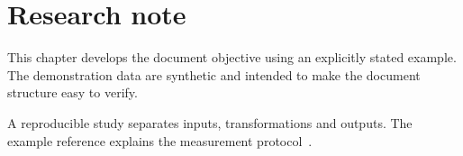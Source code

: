 \section{Research note}


\label{sec:chapter1}
This chapter develops the document objective using an explicitly stated example. The demonstration data are synthetic and intended to make the document structure easy to verify.

A reproducible study separates inputs, transformations and outputs. The example reference explains the measurement protocol~\cite{example}.
